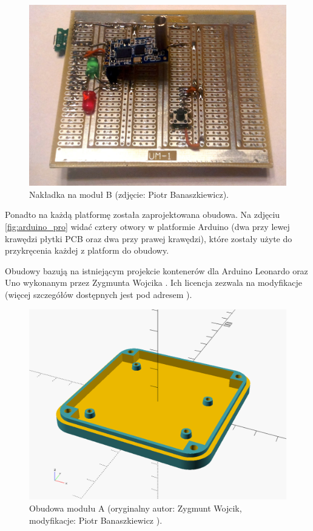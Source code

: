 \begin{figure}[h]
	\centering
	\includegraphics[scale=0.25]{pics/moduleB_hat.jpg}
	\caption{\label{fig:moduleB_hat}Nakładka na moduł B (zdjęcie: Piotr Banaszkiewicz).}
\end{figure}

Ponadto na każdą platformę została zaprojektowana obudowa. Na zdjęciu \ref{fig:arduino_pro} widać cztery otwory w platformie Arduino (dwa przy lewej krawędzi płytki PCB oraz dwa przy prawej krawędzi), które zostały użyte do przykręcenia każdej z platform do obudowy.

Obudowy bazują na istniejącym projekcie kontenerów dla Arduino Leonardo oraz Uno wykonanym przez Zygmunta Wojcika  \cite{Woj15}. Ich licencja zezwala na modyfikacje (więcej szczegółów dostępnych jest pod adresem \cite{CasesLicense}).

\begin{figure}[H]
	\centering
	\includegraphics[scale=0.3]{pics/moduleA_case.png}
	\caption{\label{fig:moduleA_case}Obudowa modułu A (oryginalny autor: Zygmunt Wojcik, modyfikacje: Piotr Banaszkiewicz \cite{CasesLicense}).}
\end{figure}

